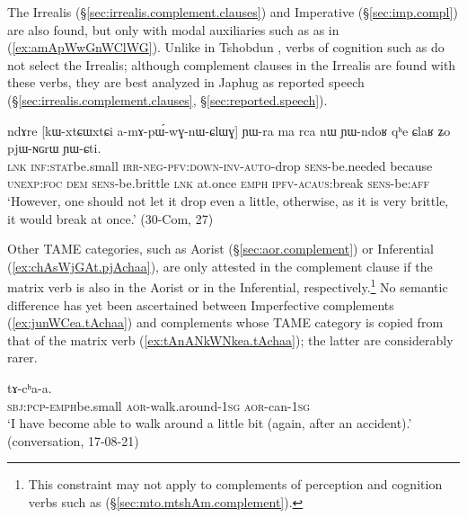 The Irrealis (§\ref{sec:irrealis.complement.clauses}) and Imperative (§\ref{sec:imp.compl}) are also found, but only with modal auxiliaries such as  as in (\ref{ex:amApWwGnWClWG}). Unlike in Tshobdun \citep[807]{jackson07irrealis},  verbs of cognition such as  do not select the Irrealis; although complement clauses in the Irrealis are found with these verbs, they are best analyzed in Japhug as reported speech (§\ref{sec:irrealis.complement.clauses}, §\ref{sec:reported.speech}). 

\begin{exe}
\ex \label{ex:amApWwGnWClWG}
\gll  ndɤre [kɯ-xtɕɯ\redp{}xtɕi a-mɤ-pɯ́-wɣ-nɯ-ɕlɯɣ] ɲɯ-ra ma rca nɯ ɲɯ-ndoʁ qʰe ɕlaʁ ʑo pjɯ-ɴɢrɯ ɲɯ-ɕti. \\
\textsc{lnk} \textsc{inf}:\textsc{stat}\redp{}be.small \textsc{irr}-\textsc{neg}-\textsc{pfv}:\textsc{down}-\textsc{inv}-\textsc{auto}-drop \textsc{sens}-be.needed because \textsc{unexp}:\textsc{foc} \textsc{dem} \textsc{sens}-be.brittle \textsc{lnk} at.once \textsc{emph} \textsc{ipfv}-\textsc{acaus}:break \textsc{sens}-be:\textsc{aff} \\
\glt `However, one should not let it drop even a little, otherwise, as it is very brittle, it would break at once.' (30-Com, 27)
\end{exe}

Other TAME categories, such as Aorist (§\ref{sec:aor.complement}) or Inferential (\ref{ex:chAsWjGAt.pjAchaa}), are only attested in the complement clause if the matrix verb is also in the Aorist or in the Inferential, respectively.\footnote{This constraint may not apply to complements of perception and cognition verbs such as  (§\ref{sec:mto.mtshAm.complement}). } No semantic difference has yet been ascertained between Imperfective complements (\ref{ex:junWCea.tAchaa}) and complements whose TAME category is copied from that of the matrix verb (\ref{ex:tAnANkWNkea.tAchaa}); the latter are considerably rarer.

\begin{exe}
\ex \label{ex:tAnANkWNkea.tAchaa}
  tɤ-cʰa-a. \\
 \textsc{sbj}:\textsc{pcp}-\textsc{emph}\redp{}be.small \textsc{aor}-walk.around-\textsc{1sg} \textsc{aor}-can-\textsc{1sg} \\
 \glt `I have become able to walk around a little bit (again, after an accident).' (conversation, 17-08-21)
\end{exe}

